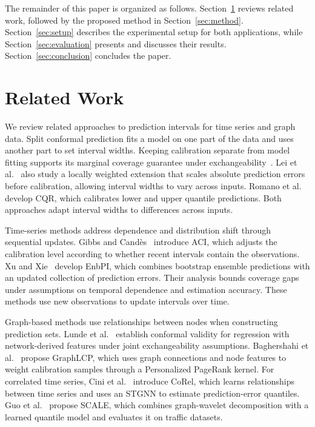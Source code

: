 \documentclass[conference]{IEEEtran}
\begin{document}
The remainder of this paper is organized as follows. Section~\ref{sec:related-work} reviews related work, followed by the proposed method in Section~\ref{sec:method}. Section~\ref{sec:setup} describes the experimental setup for both applications, while Section~\ref{sec:evaluation} presents and discusses their results. Section~\ref{sec:conclusion} concludes the paper.

\section{Related Work}
\label{sec:related-work}

We review related approaches to prediction intervals for time series and graph data. Split conformal prediction fits a model on one part of the data and uses another part to set interval widths. Keeping calibration separate from model fitting supports its marginal coverage guarantee under exchangeability~\cite{lei2018distributionfree}. Lei et al.~\cite{lei2018distributionfree} also study a locally weighted extension that scales absolute prediction errors before calibration, allowing interval widths to vary across inputs. Romano et al.~\cite{romano2019cqr} develop CQR, which calibrates lower and upper quantile predictions. Both approaches adapt interval widths to differences across inputs.

Time-series methods address dependence and distribution shift through sequential updates. Gibbs and Cand\`es~\cite{gibbs2021adaptive} introduce ACI, which adjusts the calibration level according to whether recent intervals contain the observations. Xu and Xie~\cite{xu2023timeseries} develop EnbPI, which combines bootstrap ensemble predictions with an updated collection of prediction errors. Their analysis bounds coverage gaps under assumptions on temporal dependence and estimation accuracy. These methods use new observations to update intervals over time.

Graph-based methods use relationships between nodes when constructing prediction sets. Lunde et al.~\cite{lunde2025network} establish conformal validity for regression with network-derived features under joint exchangeability assumptions. Baghershahi et al.~\cite{baghershahi2026graphlcp} propose GraphLCP, which uses graph connections and node features to weight calibration samples through a Personalized PageRank kernel. For correlated time series, Cini et al.~\cite{cini2025relational} introduce CoRel, which learns relationships between time series and uses an STGNN to estimate prediction-error quantiles. Guo et al.~\cite{guo2026scale} propose SCALE, which combines graph-wavelet decomposition with a learned quantile model and evaluates it on traffic datasets.
\end{document}
